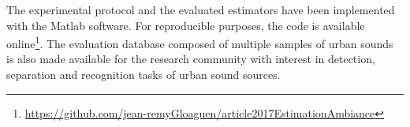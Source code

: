 \documentclass[twocolumn,a4paper,10pt]{article}
\begin{document}
The experimental protocol and the evaluated estimators have been implemented with the Matlab software. For reproducible purposes, the code is available online\footnote{\url{https://github.com/jean-remyGloaguen/article2017EstimationAmbiance}}. The evaluation database composed of multiple samples of urban sounds is also made available for the research community with interest in detection, separation and recognition tasks of urban sound sources.

\vspace{6pt}

\footnotesize


\end{document}
